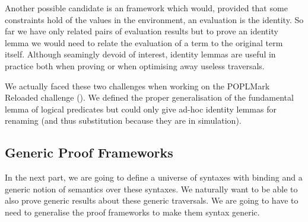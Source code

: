 Another possible candidate is an  framework which would, provided that some
constraints hold of the values in the environment, an evaluation is the identity. So far
we have only related pairs of evaluation results but to prove an identity lemma we would
need to relate the evaluation of a term to the original term itself. Although seamingly
devoid of interest, identity lemmas are useful in practice both when proving or when
optimising away useless traversals.

We actually faced these two challenges when working on the POPLMark Reloaded challenge
(\cite{poplmark2}). We defined the proper generalisation of the fundamental lemma of
logical predicates but could only give ad-hoc identity lemmas for renaming (and thus
substitution because they are in simulation).

\subsection{Generic Proof Frameworks}

In the next part, we are going to define a universe of syntaxes with binding and a generic
notion of semantics over these syntaxes. We naturally want to be able to also prove generic
results about these generic traversals. We are going to have to need to generalise the proof
frameworks to make them syntax generic.
